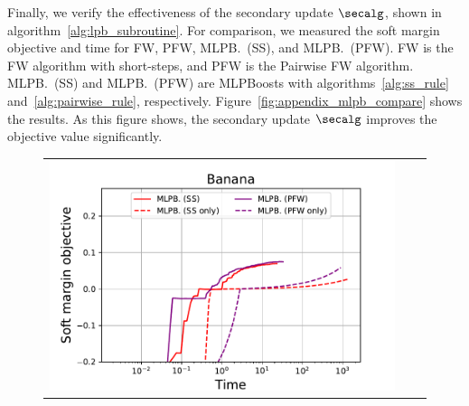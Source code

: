 Finally, we verify the effectiveness of the secondary update $\secalg$, 
shown in algorithm~\ref{alg:lpb_subroutine}. 
For comparison, we measured the soft margin objective and time 
for FW, PFW, MLPB.~(SS), and MLPB.~(PFW). 
FW is the FW algorithm with short-steps, 
and PFW is the Pairwise FW algorithm. 
MLPB.~(SS) and MLPB.~(PFW) are MLPBoosts 
with algorithms~\ref{alg:ss_rule} and~\ref{alg:pairwise_rule}, 
respectively. 
Figure~\ref{fig:appendix_mlpb_compare} shows the results. 
As this figure shows, 
the secondary update $\secalg$ 
improves the objective value significantly. 
\begin{figure}[p]
    \centering
    \begin{tabular}{ccc}
        \begin{minipage}[t]{0.31\hsize}
            \centering
            \includegraphics[keepaspectratio, scale=0.30]
            {figure/compare_fw_banana.pdf}
        \end{minipage}
        &
        \begin{minipage}[t]{0.31\hsize}
            \centering
            \includegraphics[keepaspectratio, scale=0.30]

\end{minipage}
\end{tabular}
\end{figure}
